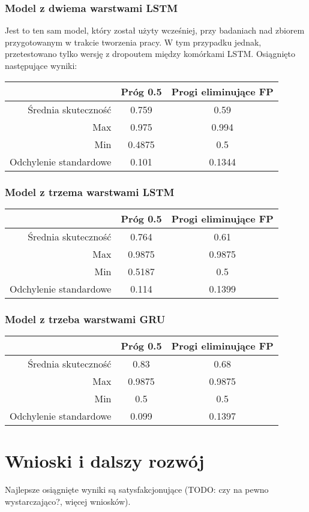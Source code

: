 	\subsubsection{Model z dwiema warstwami LSTM}
	Jest to ten sam model, który został użyty wcześniej, przy badaniach nad zbiorem przygotowanym w trakcie tworzenia pracy. W tym przypadku jednak, przetestowano tylko wersję z dropoutem między komórkami LSTM. Osiągnięto następujące wyniki:

	\begin{tabular}{|r|c|c|}
	\hline
	& Próg 0.5 & Progi eliminujące FP \\ \hline
	Średnia skuteczność & 0.759 & 0.59 \\ \hline
	Max & 0.975 & 0.994 \\ \hline
	Min & 0.4875 & 0.5 \\ \hline
	Odchylenie standardowe & 0.101 & 0.1344 \\ \hline
	\end{tabular}

	\subsubsection{Model z trzema warstwami LSTM}
	\begin{tabular}{|r|c|c|}
	\hline
	& Próg 0.5 & Progi eliminujące FP \\ \hline
	Średnia skuteczność & 0.764 & 0.61 \\ \hline
	Max & 0.9875 & 0.9875 \\ \hline
	Min & 0.5187 & 0.5 \\ \hline
	Odchylenie standardowe & 0.114 & 0.1399 \\ \hline
	\end{tabular}

	\subsubsection{Model z trzeba warstwami GRU}
	\begin{tabular}{|r|c|c|}
	\hline
	& Próg 0.5 & Progi eliminujące FP \\ \hline
	Średnia skuteczność & 0.83 & 0.68 \\ \hline
	Max & 0.9875 & 0.9875 \\ \hline
	Min & 0.5 & 0.5 \\ \hline
	Odchylenie standardowe & 0.099 & 0.1397 \\ \hline
	\end{tabular}
\section{Wnioski i dalszy rozwój}
Najlepsze osiągnięte wyniki są satysfakcjonujące (TODO: czy na pewno wystarczająco?, więcej wniosków).

